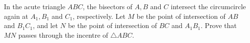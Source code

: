 In the acute triangle $ABC$,  the bisectors of $A,B$ and $C$ intersect the circumcircle again at $A_1,B_1$ and $C_1$,  respectively. Let $M$ be the point of intersection of $AB$ and $B_1C_1$,  and let $N$ be the point of intersection of $BC$ and $A_1B_1$. Prove that $MN$ passes through the incentre of $\triangle ABC$.
